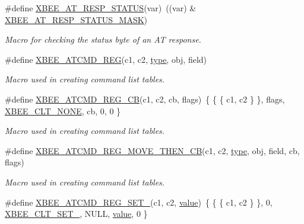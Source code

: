 \begin{DoxyCompactItemize}
\item 
\#define \hyperlink{group__xbee__atcmd_ga4dc292cd07dfd93bbfb2b8632b580949}{X\-B\-E\-E\-\_\-\-A\-T\-\_\-\-R\-E\-S\-P\-\_\-\-S\-T\-A\-T\-U\-S}(var)~((var) \& \hyperlink{group__xbee__atcmd_ggac6a27f1b1ee32b75b6f966afbb347f22adb75bf991027151c1aa20a454e278145}{X\-B\-E\-E\-\_\-\-A\-T\-\_\-\-R\-E\-S\-P\-\_\-\-S\-T\-A\-T\-U\-S\-\_\-\-M\-A\-S\-K})
\begin{DoxyCompactList}\small\item\em Macro for checking the status byte of an A\-T response. \end{DoxyCompactList}\item 
\#define \hyperlink{group__xbee__atcmd_gaafe33c3d8ea48b42b25d1183eaf93071}{X\-B\-E\-E\-\_\-\-A\-T\-C\-M\-D\-\_\-\-R\-E\-G}(c1, c2, \hyperlink{group__zcl_ga1d127017fb298b889f4ba24752d08b8e}{type}, obj, field)
\begin{DoxyCompactList}\small\item\em Macro used in creating command list tables. \end{DoxyCompactList}\item 
\#define \hyperlink{group__xbee__atcmd_gabbaf60bd4d186b860fd58c8a6111e9f9}{X\-B\-E\-E\-\_\-\-A\-T\-C\-M\-D\-\_\-\-R\-E\-G\-\_\-\-C\-B}(c1, c2, cb, flags)~\{ \{ \{ c1, c2 \} \}, flags, \hyperlink{group__xbee__atcmd_gga1bd8ecd38c107579d20ded3c79a7d70ba01bd43706bd844415cc0882b861df4d1}{X\-B\-E\-E\-\_\-\-C\-L\-T\-\_\-\-N\-O\-N\-E}, cb, 0, 0 \}
\begin{DoxyCompactList}\small\item\em Macro used in creating command list tables. \end{DoxyCompactList}\item 
\#define \hyperlink{group__xbee__atcmd_gaf5f12cd2d94f9f4ecf0a679196a6ed21}{X\-B\-E\-E\-\_\-\-A\-T\-C\-M\-D\-\_\-\-R\-E\-G\-\_\-\-M\-O\-V\-E\-\_\-\-T\-H\-E\-N\-\_\-\-C\-B}(c1, c2, \hyperlink{group__zcl_ga1d127017fb298b889f4ba24752d08b8e}{type}, obj, field, cb, flags)
\begin{DoxyCompactList}\small\item\em Macro used in creating command list tables. \end{DoxyCompactList}\item 
\#define \hyperlink{group__xbee__atcmd_ga37dcc1cfc854d7876be99eff279bf2a0}{X\-B\-E\-E\-\_\-\-A\-T\-C\-M\-D\-\_\-\-R\-E\-G\-\_\-\-S\-E\-T\-\_}(c1, c2, \hyperlink{group__zcl_ga1ed5b151a90f7e99af8cca2e6875ddf4}{value})~\{ \{ \{ c1, c2 \} \}, 0, \hyperlink{group__xbee__atcmd_gga1bd8ecd38c107579d20ded3c79a7d70ba0eb2ffa9c761ab74335695f818ce8410}{X\-B\-E\-E\-\_\-\-C\-L\-T\-\_\-\-S\-E\-T\-\_}, N\-U\-L\-L, \hyperlink{group__zcl_ga1ed5b151a90f7e99af8cca2e6875ddf4}{value}, 0 \}

\end{DoxyCompactItemize}
